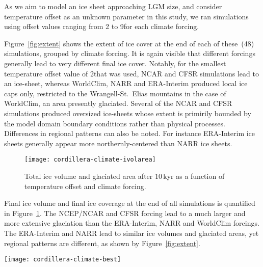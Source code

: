 As we aim to model an ice sheet approaching LGM size, and consider temperature offset as an unknown parameter in this study, we ran simulations using offset values ranging from 2 to 9\degC for each climate forcing.

Figure~\ref{fig:extent} shows the extent of ice cover at the end of each of these~(48) simulations, grouped by climate forcing. It is again visible that different forcings generally lead to very different final ice cover. Notably, for the smallest temperature offset value of 2\degC that was used, NCAR and CFSR simulations lead to an ice-sheet, whereas WorldClim, NARR and ERA-Interim produced local ice caps only, restricted to the Wrangell-St.~Elias mountains in the case of WorldClim, an area presently glaciated. Several of the NCAR and CFSR simulations produced oversized ice-sheets whose extent is primirily bounded by the model domain boundary conditions rather than physical processes. Differences in regional patterns can also be noted. For instance ERA-Interim ice sheets generally appear more northernly-centered than NARR ice sheets.

\begin{figure}[t]
	\vspace*{2mm}
	\begin{center}
		\texttt{[image: cordillera-climate-ivolarea]}
	\end{center}
	\caption{Total ice volume and glaciated area after 10\,kyr as a function of temperature offset and climate forcing.}
	\label{fig:ivolarea}
\end{figure}

Final ice volume and final ice coverage at the end of all simulations is quantified in Figure~\ref{fig:ivolarea}. The NCEP/NCAR and CFSR forcing lead to a much larger and more extensive glaciation than the ERA-Interim, NARR and WorldClim forcings. The ERA-Interim and NARR lead to similar ice volumes and glaciated areas, yet regional patterns are different, as shown by Figure~\ref{fig:extent}.

\begin{figure*}[t]
	\vspace*{2mm}
	\begin{center}
		\texttt{[image: cordillera-climate-best]}
	\end{center}
	\caption{Ice surface topography (black contours every 1000\,m) and velocity (\unit{m\,yr^{-1}}) after 10\,kyr using temperature offsets that lead to similar areas of ice cover for each climate forcing.}
	\label{fig:best}
\end{figure*}

